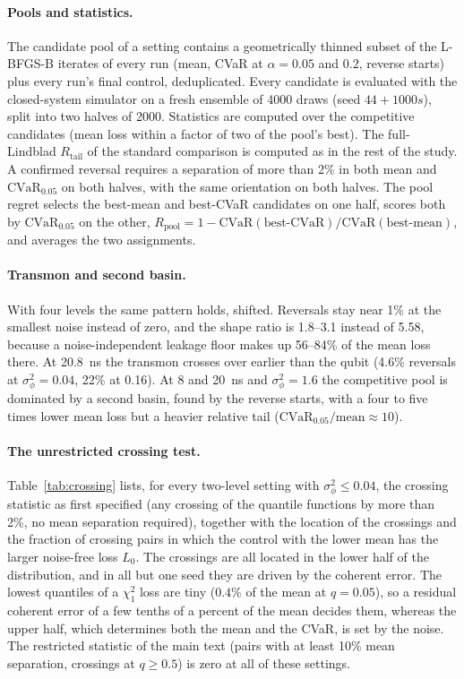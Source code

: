 \documentclass[aps,pra,onecolumn,notitlepage,superscriptaddress,nofootinbib,floatfix]{revtex4-2}
\newcommand{\cvar}{\mathrm{CVaR}}
\newcommand{\Rt}{R_{\mathrm{tail}}}
\begin{document}
\paragraph*{Pools and statistics.} The candidate pool of a setting contains a
geometrically thinned subset of the L-BFGS-B iterates of every run (mean,
CVaR at $\alpha=0.05$ and $0.2$, reverse starts) plus every run's final
control, deduplicated. Every candidate is evaluated with the closed-system
simulator on a fresh ensemble of 4000 draws (seed $44+1000s$), split into two
halves of 2000. Statistics are computed over the competitive candidates (mean
loss within a factor of two of the pool's best). The full-Lindblad
$\Rt$ of the standard comparison is computed as in the rest of the study.
A confirmed reversal requires a separation of more than 2\% in both mean and
$\cvar_{0.05}$ on both halves, with the same orientation on both halves. The
pool regret selects the best-mean and best-CVaR candidates on one half,
scores both by $\cvar_{0.05}$ on the other,
$R_{\mathrm{pool}}=1-\cvar(\text{best-CVaR})/\cvar(\text{best-mean})$, and
averages the two assignments.

\paragraph*{Transmon and second basin.} With four levels the same pattern
holds, shifted. Reversals stay near 1\% at the smallest noise instead of zero,
and the shape ratio is 1.8--3.1 instead of 5.58, because a noise-independent
leakage floor makes up 56--84\% of the mean loss there. At 20.8~ns the
transmon crosses over earlier than the qubit (4.6\% reversals at
$\sigma_\phi^2=0.04$, 22\% at 0.16). At 8 and 20~ns and $\sigma_\phi^2=1.6$
the competitive pool is dominated by a second basin, found by the reverse
starts, with a four to five times lower mean loss but a heavier relative tail
($\cvar_{0.05}/\text{mean}\approx10$).

\paragraph*{The unrestricted crossing test.}
\label{sec:crossing}
Table~\ref{tab:crossing} lists, for every two-level setting with
$\sigma_\phi^2\le0.04$, the crossing statistic as first specified (any
crossing of the quantile functions by more than 2\%, no mean separation
required), together with the location of the crossings and the fraction of
crossing pairs in which the control with the lower mean has the larger
noise-free loss $L_0$. The crossings are all located in the lower half of the
distribution, and in all but one seed they are driven by the coherent error.
The lowest quantiles of a $\chi^2_1$ loss are tiny ($0.4\%$ of the mean at
$q=0.05$), so a residual coherent error of a few tenths of a percent of the
mean decides them, whereas the upper half, which determines both the mean
and the CVaR, is set by the noise. The restricted statistic of the main text
(pairs with at least 10\% mean separation, crossings at $q\ge0.5$) is zero at
all of these settings.
\end{document}
